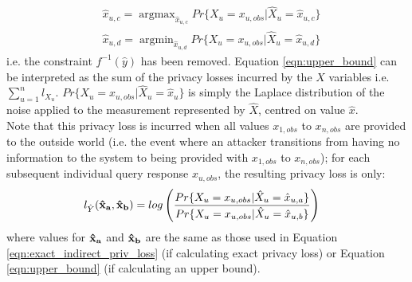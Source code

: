 \documentclass[12pt]{article}
\DeclareMathOperator*{\argmax}{argmax}
\DeclareMathOperator*{\argmin}{argmin}
\begin{document}
\begin{appendix}
\begin{align}
      & \hat{x}_{u,c} = \argmax_{\hat{x}_{u,c}}Pr\{ X_u = x_{u,obs} | \hat{X}_u = \hat{x}_{u,c} \} \nonumber \\
      & \hat{x}_{u,d} = \argmin_{\hat{x}_{u,d}}Pr\{ X_u = x_{u,obs} | \hat{X}_u = \hat{x}_{u,d} \} \nonumber
    \end{align}
    i.e. the constraint $f^{-1}(\hat{y})$ has been removed. Equation \ref{eqn:upper_bound} can be interpreted as the sum of the privacy losses incurred by the $X$ variables i.e. $\sum_{u=1}^n l_{X_u}$. $Pr\{ X_u = x_{u,obs} | \hat{X}_u = \hat{x}_u \}$ is simply the Laplace distribution of the noise applied to the measurement represented by $\hat{X}$, centred on value $\hat{x}$.\\

    Note that this privacy loss is incurred when all values $x_{1,obs}$ to $x_{n,obs}$ are provided to the outside world (i.e. the event where an attacker transitions from having no information to the system to being provided with $x_{1,obs}$ to $x_{n,obs}$); for each subsequent individual query response $x_{u,obs}$, the resulting privacy loss is only:
    \begin{align}
      l_{\hat{Y}}(\bf{\hat{x}_a}, \bf{\hat{x}_b}) & = log \left( \frac{Pr\{ X_u = x_{u,obs} | \hat{X}_u = \hat{x}_{u,a} \}} {Pr\{ X_u = x_{u,obs} | \hat{X}_u = \hat{x}_{u,b} \}} \right)
    \end{align}
     where values for $\bf{\hat{x}_a}$ and $\bf{\hat{x}_b}$ are the same as those used in Equation \ref{eqn:exact_indirect_priv_loss} (if calculating exact privacy loss) or Equation \ref{eqn:upper_bound} (if calculating an upper bound).\\


\end{appendix}
\end{document}
